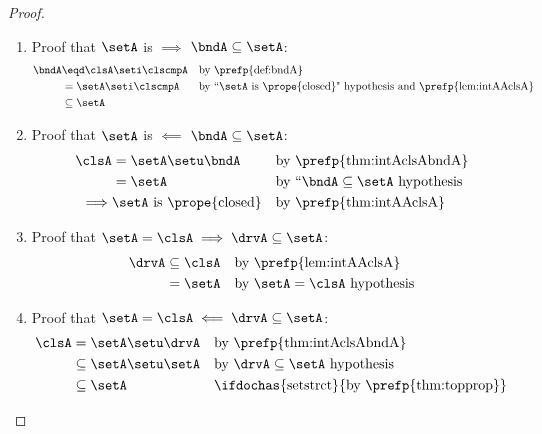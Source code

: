 \begin{proof}
\begin{enumerate}
  \item Proof that $\setA$ is  $\implies$ $\bndA\subseteq\setA$:
    \begin{align*}
      \bndA
        &\eqd \clsA\seti\clscmpA
        &&    \text{by \prefp{def:bndA}}
      \\&=    \setA\seti\clscmpA
        &&    \text{by ``$\setA$ is \prope{closed}" hypothesis and \prefp{lem:intAAclsA}}
      \\&\subseteq \setA
    \end{align*}

  \item Proof that $\setA$ is  $\impliedby$ $\bndA\subseteq\setA$:
    \begin{align*}
      \clsA
        &=    \setA\setu\bndA
        &&    \text{by \prefp{thm:intAclsAbndA}}
      \\&=    \setA
        &&    \text{by ``$\bndA\subseteq\setA$ hypothesis}
      \\\implies & \text{$\setA$ is \prope{closed}}
        && \text{by \prefp{thm:intAAclsA}}
    \end{align*}

  \item Proof that $\setA=\clsA\implies\drvA\subseteq\setA$:
    \begin{align*}
      \drvA
        &\subseteq \clsA
        && \text{by \prefp{lem:intAAclsA}}
      \\&= \setA
        && \text{by $\setA=\clsA$ hypothesis}
    \end{align*}

  \item Proof that $\setA=\clsA\impliedby\drvA\subseteq\setA$:
    \begin{align*}
      \clsA
        &= \setA\setu\drvA
        && \text{by \prefp{thm:intAclsAbndA}}
      \\&\subseteq \setA\setu\setA
        && \text{by $\drvA\subseteq\setA$ hypothesis}
      \\&\subseteq \setA
        && \text{\ifdochas{setstrct}{by \prefp{thm:topprop}}}
    \end{align*}
\end{enumerate}
\end{proof}





